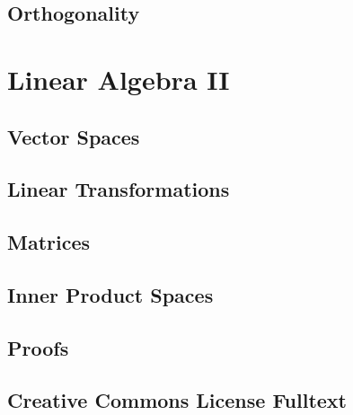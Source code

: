 \documentclass[letter, 11pt, onesided]{memoir}
\renewcommand{\chapnumfont}{\normalfont\huge\sffamily\bfseries}
\renewcommand{\printchaptername}{\chapnumfont Chapter}
\numberwithin{dummy}{section}
\theoremstyle{orangenumbox}
\theoremstyle{ocrenumbox}
\begin{document}
\chapter{Orthogonality}
	
	\clearpage

\part{Linear Algebra II}
\chapter{Vector Spaces}
	
	\clearpage
\chapter{Linear Transformations}
	
	\clearpage
\chapter{Matrices}
	
	\clearpage
\chapter{Inner Product Spaces}
	
	\clearpage

\appendix
\renewcommand{\printchaptername}{\chapnumfont Appendix}
\chapter{Proofs}
	\label{APPENDIX-proofstyle}
	

\chapter{Creative Commons License Fulltext}
	\label{APPENDIX-license}
	

\backmatter


% 
% 
\end{document}
